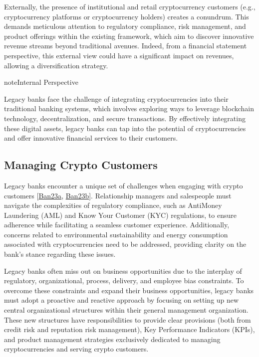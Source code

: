 \documentclass[letterpaper,10pt,english]{jupyterBook}
\begin{document}
\sphinxAtStartPar
Externally, the presence of institutional and retail cryptocurrency customers (e.g., cryptocurrency platforms or cryptocurrency holders) creates a conundrum. This demands meticulous attention to regulatory compliance, risk management, and product offerings within the existing framework, which aim to discover innovative revenue streams beyond traditional avenues. Indeed, from a financial statement perspective, this external view could have a significant impact on revenues, allowing a diversification strategy.

\begin{sphinxadmonition}{note}{Internal Perspective}

\sphinxAtStartPar
Legacy banks face the challenge of integrating cryptocurrencies into their traditional banking systems, which involves exploring ways to leverage blockchain technology, decentralization, and secure transactions. By effectively integrating these digital assets, legacy banks can tap into the potential of cryptocurrencies and offer innovative financial services to their customers.
\end{sphinxadmonition}


\subsection{Managing Crypto Customers}
\label{\detokenize{LEGACY/legacy:managing-crypto-customers}}
\sphinxAtStartPar
Legacy banks encounter a unique set of challenges when engaging with crypto customers {[}\hyperlink{cite.LEGACY/legacy:id93}{Ban23a}, \hyperlink{cite.LEGACY/legacy:id94}{Ban23b}{]}. Relationship managers and salespeople must navigate the complexities of regulatory compliance, such as Anti\sphinxhyphen{}Money Laundering (AML) and Know Your Customer (KYC) regulations, to ensure adherence while facilitating a seamless customer experience. Additionally, concerns related to environmental sustainability and energy consumption associated with cryptocurrencies need to be addressed, providing clarity on the bank’s stance regarding these issues.

\sphinxAtStartPar
Legacy banks often miss out on business opportunities due to the interplay of regulatory, organizational, process, delivery, and employee bias constraints. To overcome these constraints and expand their business opportunities, legacy banks must adopt a proactive and reactive approach by focusing on setting up new central organizational structures within their general management organization. These new structures have responsibilities to provide clear provisions (both from credit risk and reputation risk management), Key Performance Indicators (KPIs), and product management strategies exclusively dedicated to managing cryptocurrencies and serving crypto customers.
\end{document}
